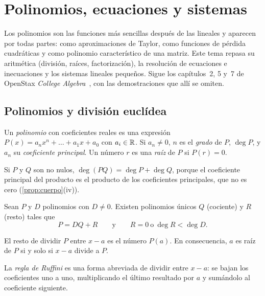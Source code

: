 \chapter{Polinomios, ecuaciones y sistemas}
\label{tema:3}

Los polinomios son las funciones más sencillas después de las lineales y aparecen por todas partes: como aproximaciones de Taylor, como funciones de pérdida cuadráticas y como polinomio característico de una matriz. Este tema repasa su aritmética (división, raíces, factorización), la resolución de ecuaciones e inecuaciones y los sistemas lineales pequeños. Sigue los capítulos~2, 5 y~7 de OpenStax \emph{College Algebra}~\cite{openstax}, con las demostraciones que allí se omiten.

\section{Polinomios y división euclídea}

\begin{definicion}[Polinomio]
Un \emph{polinomio} con coeficientes reales es una expresión $P(x)=a_nx^n+\dots+a_1x+a_0$ con $a_i\in\mathbb{R}$. Si $a_n\neq0$, $n$ es el \emph{grado} de $P$, $\deg P$, y $a_n$ su \emph{coeficiente principal}. Un número $r$ es una \emph{raíz} de $P$ si $P(r)=0$.
\end{definicion}

Si $P$ y $Q$ son no nulos, $\deg(PQ)=\deg P+\deg Q$, porque el coeficiente principal del producto es el producto de los coeficientes principales, que no es cero (\cref{prop:cuerpo}(iv)).

\begin{teorema}\label{teo:division}
Sean $P$ y $D$ polinomios con $D\neq0$. Existen polinomios únicos $Q$ (cociente) y $R$ (resto) tales que
\[
P=DQ+R\qquad\text{y}\qquad R=0\ \text{o}\ \deg R<\deg D.
\]
\end{teorema}

\begin{teorema}\label{teo:resto}
El resto de dividir $P$ entre $x-a$ es el número $P(a)$. En consecuencia, $a$ es raíz de $P$ si y solo si $x-a$ divide a $P$.
\end{teorema}

La \emph{regla de Ruffini} es una forma abreviada de dividir entre $x-a$: se bajan los coeficientes uno a uno, multiplicando el último resultado por $a$ y sumándolo al coeficiente siguiente.

